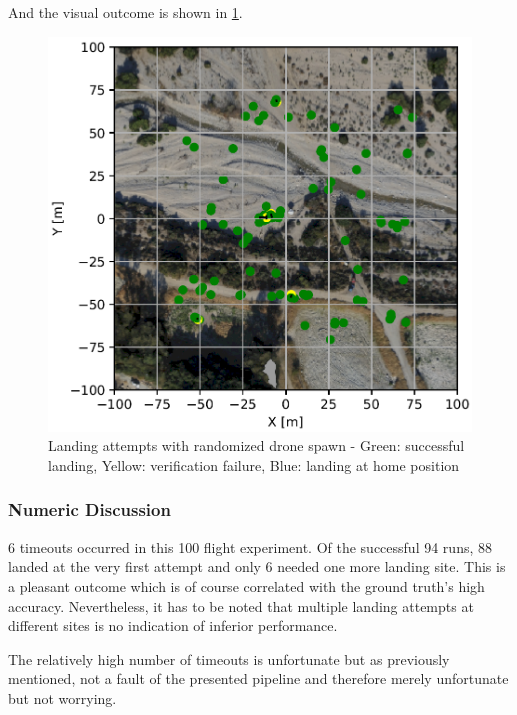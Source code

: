     And the visual outcome is shown in \cref{fig:landing_attempts_complete_rand}.

    \begin{figure}[h!]
        \begin{center}
            \includegraphics[scale=0.5]{images/evaluation/landings_complete_randomized_GT.png}
            \caption{Landing attempts with randomized drone spawn - Green: successful landing, Yellow: verification failure, Blue: landing at home position}
            \label{fig:landing_attempts_complete_rand}
        \end{center}
    \end{figure}

    \subsubsection{Numeric Discussion}
    6 timeouts occurred in this 100 flight experiment. Of the successful 94 runs, 88 landed at the very first attempt and only 6 needed one more landing site. This is a pleasant outcome which is of course correlated with the ground truth's high accuracy. Nevertheless, it has to be noted that multiple landing attempts at different sites is no indication of inferior performance. 

    The relatively high number of timeouts is unfortunate but as previously mentioned, not a fault of the presented pipeline and therefore merely unfortunate but not worrying.


